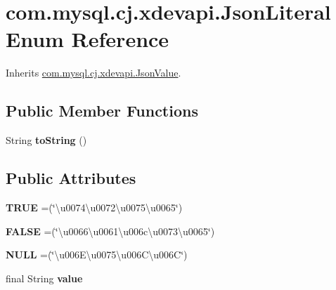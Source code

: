 \hypertarget{enumcom_1_1mysql_1_1cj_1_1xdevapi_1_1_json_literal}{}\section{com.\+mysql.\+cj.\+xdevapi.\+Json\+Literal Enum Reference}
\label{enumcom_1_1mysql_1_1cj_1_1xdevapi_1_1_json_literal}


Inherits \mbox{\hyperlink{interfacecom_1_1mysql_1_1cj_1_1xdevapi_1_1_json_value}{com.\+mysql.\+cj.\+xdevapi.\+Json\+Value}}.

\subsection*{Public Member Functions}
\begin{DoxyCompactItemize}
\item 
\mbox{\label{enumcom_1_1mysql_1_1cj_1_1xdevapi_1_1_json_literal_a0e69ab344309afb640758d107a6ebccd}} 
String {\bfseries to\+String} ()
\end{DoxyCompactItemize}
\subsection*{Public Attributes}
\begin{DoxyCompactItemize}
\item 
\mbox{\label{enumcom_1_1mysql_1_1cj_1_1xdevapi_1_1_json_literal_a722be7500d3b4eaca0cff79a1d09b547}} 
{\bfseries T\+R\+UE} =(\char`\"{}\textbackslash{}u0074\textbackslash{}u0072\textbackslash{}u0075\textbackslash{}u0065\char`\"{})
\item 
\mbox{\label{enumcom_1_1mysql_1_1cj_1_1xdevapi_1_1_json_literal_a916ec267d9278e15e933d8e9c63b7c00}} 
{\bfseries F\+A\+L\+SE} =(\char`\"{}\textbackslash{}u0066\textbackslash{}u0061\textbackslash{}u006c\textbackslash{}u0073\textbackslash{}u0065\char`\"{})
\item 
\mbox{\label{enumcom_1_1mysql_1_1cj_1_1xdevapi_1_1_json_literal_ac7dcd6501113b4b9941a96fb4d91ae2c}} 
{\bfseries N\+U\+LL} =(\char`\"{}\textbackslash{}u006\+E\textbackslash{}u0075\textbackslash{}u006\+C\textbackslash{}u006C\char`\"{})
\item 
\mbox{\label{enumcom_1_1mysql_1_1cj_1_1xdevapi_1_1_json_literal_a4faaa8c9c53810006badb212c2187575}} 
final String {\bfseries value}
\end{DoxyCompactItemize}


